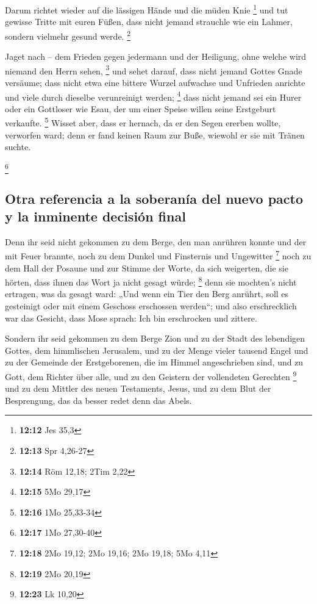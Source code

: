  Darum richtet wieder auf die lässigen Hände und die
müden Knie \footnote{\textbf{12:12} Jes 35,3}  und tut
gewisse Tritte mit euren Füßen, dass nicht jemand strauchle wie ein
Lahmer, sondern vielmehr gesund werde. \footnote{\textbf{12:13} Spr
  4,26-27}

 Jaget nach -- dem Frieden gegen jedermann und der
Heiligung, ohne welche wird niemand den Herrn sehen, \footnote{\textbf{12:14}
  Röm 12,18; 2Tim 2,22}  und sehet darauf, dass nicht
jemand Gottes Gnade versäume; dass nicht etwa eine bittere Wurzel
aufwachse und Unfrieden anrichte und viele durch dieselbe verunreinigt
werden; \footnote{\textbf{12:15} 5Mo 29,17}  dass nicht
jemand sei ein Hurer oder ein Gottloser wie Esau, der um einer Speise
willen seine Erstgeburt verkaufte. \footnote{\textbf{12:16} 1Mo 25,33-34}
 Wisset aber, dass er hernach, da er den Segen ererben
wollte, verworfen ward; denn er fand keinen Raum zur Buße, wiewohl er
sie mit Tränen suchte.

\footnote{\textbf{12:17} 1Mo 27,30-40}

\hypertarget{otra-referencia-a-la-soberanuxeda-del-nuevo-pacto-y-la-inminente-decisiuxf3n-final}{%
\subsection{Otra referencia a la soberanía del nuevo pacto y la
inminente decisión
final}\label{otra-referencia-a-la-soberanuxeda-del-nuevo-pacto-y-la-inminente-decisiuxf3n-final}}

 Denn ihr seid nicht gekommen zu dem Berge, den man
anrühren konnte und der mit Feuer brannte, noch zu dem Dunkel und
Finsternis und Ungewitter \footnote{\textbf{12:18} 2Mo 19,12; 2Mo 19,16;
  2Mo 19,18; 5Mo 4,11}  noch zu dem Hall der Posaune und
zur Stimme der Worte, da sich weigerten, die sie hörten, dass ihnen das
Wort ja nicht gesagt würde; \footnote{\textbf{12:19} 2Mo 20,19}
 denn sie mochten's nicht ertragen, was da gesagt ward:
„Und wenn ein Tier den Berg anrührt, soll es gesteinigt oder mit einem
Geschoss erschossen werden``;  und also erschrecklich war
das Gesicht, dass Mose sprach: Ich bin erschrocken und zittere.

 Sondern ihr seid gekommen zu dem Berge Zion und zu der
Stadt des lebendigen Gottes, dem himmlischen Jerusalem, und zu der Menge
vieler tausend Engel  und zu der Gemeinde der
Erstgeborenen, die im Himmel angeschrieben sind, und zu Gott, dem
Richter über alle, und zu den Geistern der vollendeten Gerechten
\footnote{\textbf{12:23} Lk 10,20}  und zu dem Mittler
des neuen Testaments, Jesus, und zu dem Blut der Besprengung, das da
besser redet denn das Abels.

